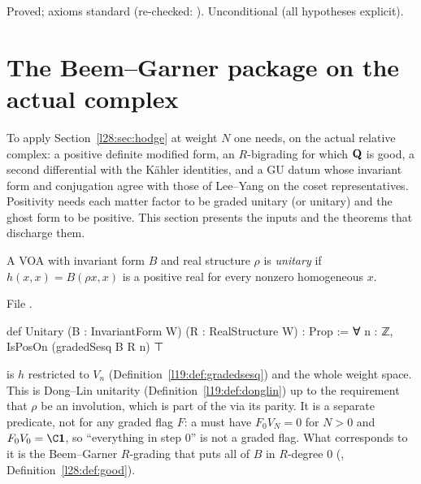 \begin{status}
Proved; axioms standard (re-checked: ). Unconditional (all hypotheses explicit).
\end{status}

\section{The Beem--Garner package on the actual complex}\label{l28:sec:package}

To apply Section~\ref{l28:sec:hodge} at weight $N$ one needs, on the actual relative complex: a positive definite modified form, an
$R$-bigrading for which $\mathbf Q$ is good, a second differential with the Kähler identities, and a GU datum whose invariant form and
conjugation agree with those of Lee--Yang on the coset representatives. Positivity needs each matter factor to be graded unitary (or
unitary) and the ghost form to be positive. This section presents the inputs and the theorems that discharge them.

\begin{definition}\label{l28:def:unitary}
A VOA with invariant form $B$ and real structure $\rho$ is \emph{unitary} if $h(x,x)=B(\rho x,x)$ is a positive real for every nonzero
homogeneous $x$.
\end{definition}

\noindent File .
\begin{leancode}
def Unitary (B : InvariantForm W) (R : RealStructure W) : Prop :=
  ∀ n : ℤ, IsPosOn (gradedSesq B R n) ⊤
\end{leancode}

\begin{dictionary}
 is $h$ restricted to $V_n$ (Definition~\ref{l19:def:gradedsesq}) and  the whole weight space. This is
Dong--Lin unitarity (Definition~\ref{l19:def:donglin}) up to the requirement that $\rho$ be an involution, which is part of the
 via its parity. It is a separate predicate, not  for any graded flag $F$: a
 must have $F_0V_N=0$ for $N>0$ and $F_0V_0=\C\ltwentyeightvac$, so ``everything in step $0$'' is not a graded flag. What
corresponds to it is the Beem--Garner $R$-grading that puts all of $B$ in $R$-degree $0$ (, Definition~\ref{l28:def:good}).
\end{dictionary}

